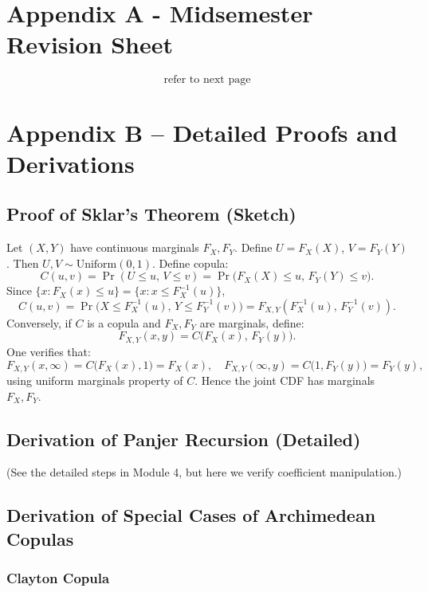 \documentclass[11pt]{article}
\begin{document}
\newpage
\section{Appendix A - Midsemester Revision Sheet}
$$\text{refer to next page}$$

\section{Appendix B – Detailed Proofs and Derivations}
\subsection{Proof of Sklar’s Theorem (Sketch)}
\noindent Let \((X,Y)\) have continuous marginals \(F_X,F_Y\). Define \(U=F_X(X)\), \(V=F_Y(Y)\). Then \(U,V\sim \text{Uniform}(0,1)\). Define copula:
\[
C(u,v) = \Pr(U \le u,\,V \le v) 
= \Pr\bigl(F_X(X)\le u,\,F_Y(Y)\le v\bigr).
\]
Since \(\{x: F_X(x)\le u\} = \{x: x \le F_X^{-1}(u)\}\),
\[
C(u,v) = \Pr\bigl(X \le F_X^{-1}(u),\,Y \le F_Y^{-1}(v)\bigr) 
= F_{X,Y}(F_X^{-1}(u),\,F_Y^{-1}(v)).
\]
\noindent Conversely, if \(C\) is a copula and \(F_X,F_Y\) are marginals, define:
\[
F_{X,Y}(x,y) = C\bigl(F_X(x),\,F_Y(y)\bigr).
\]
One verifies that:
\[
F_{X,Y}(x,\infty) = C\bigl(F_X(x),1\bigr) = F_X(x), 
\quad
F_{X,Y}(\infty,y) = C\bigl(1,F_Y(y)\bigr) = F_Y(y),
\]
using uniform marginals property of \(C\). Hence the joint CDF has marginals \(F_X, F_Y\).

\subsection{Derivation of Panjer Recursion (Detailed)}
\noindent (See the detailed steps in Module 4, but here we verify coefficient manipulation.)

\subsection{Derivation of Special Cases of Archimedean Copulas}
\subsubsection{Clayton Copula}
\end{document}
